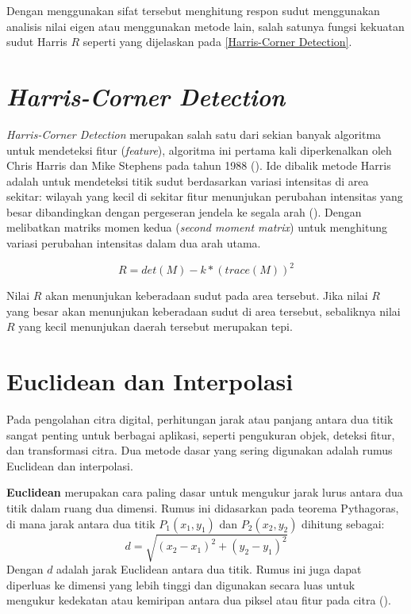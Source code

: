 Dengan menggunakan sifat tersebut menghitung respon sudut menggunakan analisis nilai eigen atau menggunakan metode lain, salah satunya fungsi kekuatan sudut Harris \(R\) seperti yang dijelaskan pada \ref{Harris-Corner Detection}.

\section{\emph{Harris-Corner Detection}}
  \emph{Harris-Corner Detection} merupakan salah satu dari sekian banyak algoritma untuk mendeteksi fitur (\emph{feature}), algoritma ini pertama kali diperkenalkan oleh Chris Harris dan Mike Stephens pada tahun 1988 (\cite{Harris2013}). 
Ide dibalik metode Harris adalah untuk mendeteksi titik sudut berdasarkan variasi intensitas di area sekitar: wilayah yang kecil di sekitar fitur menunjukan perubahan intensitas yang besar dibandingkan dengan pergeseran jendela ke segala arah (\cite[hlm. 305--308]{Sanchez2018}).
Dengan melibatkan matriks momen kedua (\emph{second moment matrix}) untuk menghitung variasi perubahan intensitas dalam dua arah utama.

\begin{equation}
  R = det(M) - k * (trace(M))^2
  \label{Harris-Corner Detection}
\end{equation}

  Nilai \(R\) akan menunjukan keberadaan sudut pada area tersebut. 
Jika nilai \(R\) yang besar akan menunjukan keberadaan sudut di area tersebut, sebaliknya nilai \(R\) yang kecil menunjukan daerah tersebut merupakan tepi.

\section{Euclidean dan Interpolasi}
  Pada pengolahan citra digital, perhitungan jarak atau panjang antara dua titik sangat penting untuk berbagai aplikasi, seperti pengukuran objek, deteksi fitur, dan transformasi citra. Dua metode dasar yang sering digunakan adalah rumus Euclidean dan interpolasi.

  \textbf{Euclidean} merupakan cara paling dasar untuk mengukur jarak lurus antara dua titik dalam ruang dua dimensi. Rumus ini didasarkan pada teorema Pythagoras, di mana jarak antara dua titik \(P_1(x_1, y_1)\) dan \(P_2(x_2, y_2)\) dihitung sebagai:
\begin{equation}
  d = \sqrt{(x_2 - x_1)^2 + (y_2 - y_1)^2}
  \label{eq:euclidean}
\end{equation}
  Dengan \(d\) adalah jarak Euclidean antara dua titik. Rumus ini juga dapat diperluas ke dimensi yang lebih tinggi dan digunakan secara luas untuk mengukur kedekatan atau kemiripan antara dua piksel atau fitur pada citra (\cite[hlm. 34]{Gonzalez2018}).

